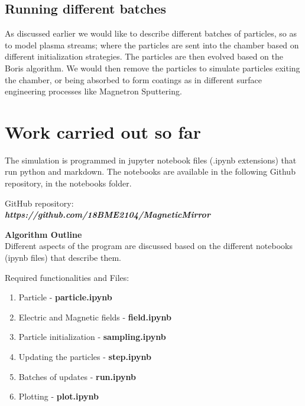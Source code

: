 \documentclass[12pt]{article}
\begin{document}
	\subsection{Running different batches}
	As discussed earlier we would like to describe different batches of particles, so as to model plasma streams; where the particles are sent into the chamber based on different initialization strategies. The particles are then evolved based on the Boris algorithm. We would then remove the particles to simulate particles exiting the chamber, or being absorbed to form coatings as in different surface engineering processes like Magnetron Sputtering.
	
	\section{Work carried out so far}
	The simulation is programmed in jupyter notebook files (.ipynb extensions) that run python and markdown. The notebooks are available in the following Github repository, in the notebooks folder.
	
	\begin{center}
		\begin{tcolorbox}[width=15cm]
			GitHub repository:
			\vspace{0.2cm} 
			\phantom{a} \\
			\phantom{push this repository}
			\textbf{\textit{https://github.com/18BME2104/MagneticMirror}} \\
			\phantom{a}
		\end{tcolorbox}
	\end{center}
	
	\textbf{Algorithm Outline} \\
	Different aspects of the program are discussed based on the different notebooks (ipynb files) that describe them.
	\begin{center}
		\begin{tcolorbox}[width=12cm]
			Required functionalities and Files:
			\vspace{0.2cm} 
			\begin{enumerate}
				\item Particle - \textbf{particle.ipynb}
				\item Electric and Magnetic fields - \textbf{field.ipynb}
				\item Particle initialization - \textbf{sampling.ipynb}
				\item Updating the particles - \textbf{step.ipynb}
				\item Batches of updates - \textbf{run.ipynb}
				\item Plotting - \textbf{plot.ipynb}
			\end{enumerate}
		\end{tcolorbox}
	\end{center}
	
\end{document}
